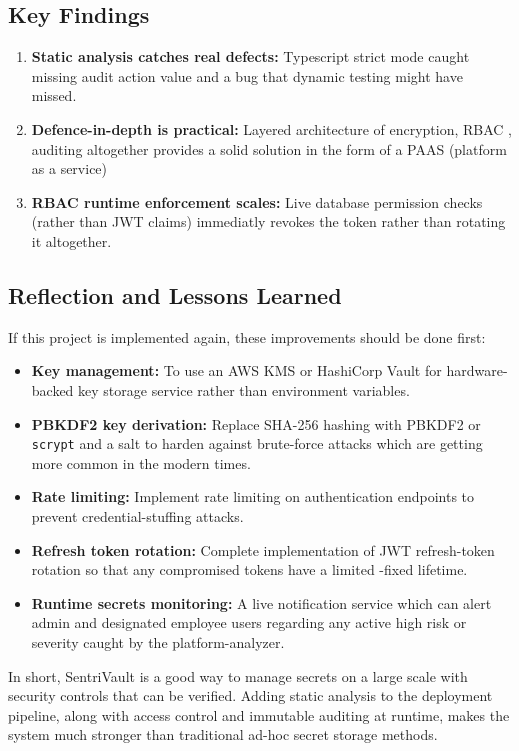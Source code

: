 \documentclass[conference]{IEEEtran}
\begin{document}
\subsection{Key Findings}

\begin{enumerate}
  \item \textbf{Static analysis catches real defects:} Typescript strict mode caught missing audit action value and a bug that dynamic testing might have missed.
  \item \textbf{Defence-in-depth is practical:} Layered architecture of encryption, RBAC , auditing altogether provides a solid solution in the form of a PAAS (platform as a service)
  \item \textbf{RBAC runtime enforcement scales:} Live database permission checks (rather than JWT claims) immediatly revokes the token rather than rotating it altogether.
\end{enumerate}

\subsection{Reflection and Lessons Learned}

If this project is implemented again, these improvements should be done first:

\begin{itemize}
  \item \textbf{Key management:} To use an AWS KMS or HashiCorp Vault for hardware-backed key storage service rather than environment variables.
  \item \textbf{PBKDF2 key derivation:} Replace SHA-256 hashing with PBKDF2 or \texttt{scrypt} and a salt to harden against brute-force attacks which are getting more common in the modern times.
  \item \textbf{Rate limiting:} Implement rate limiting on authentication endpoints to prevent credential-stuffing attacks.
  \item \textbf{Refresh token rotation:} Complete implementation of JWT refresh-token rotation so that any compromised tokens have a limited -fixed lifetime.
  \item \textbf{Runtime secrets monitoring:} A live notification service which can alert admin and designated employee users regarding any active high risk or severity caught by the platform-analyzer.
\end{itemize}


In short, SentriVault is a good way to manage secrets on a large scale with security controls that can be verified. Adding static analysis to the deployment pipeline, along with access control and immutable auditing at runtime, makes the system much stronger than traditional ad-hoc secret storage methods.
\end{document}
